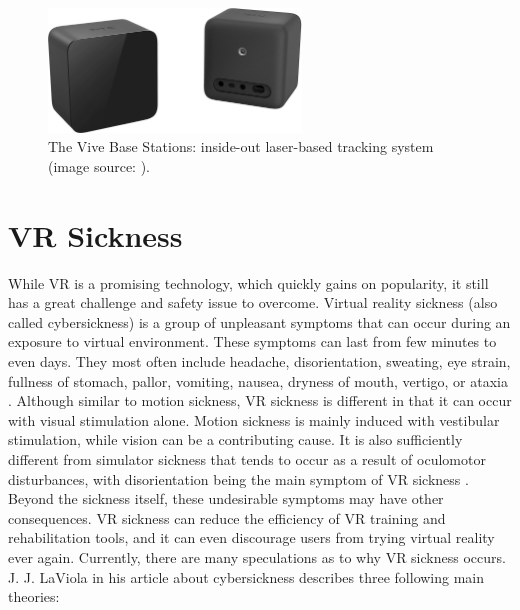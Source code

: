 \begin{figure}[th]
\centering
\includegraphics[width=0.6\textwidth]{img/base_stations.png}
\caption{The Vive Base Stations: inside-out laser-based tracking system (image source: \cite{VIVE}).}
\label{fig:BASE_STATIONS}
\end{figure}

\section{VR Sickness}

While VR is a promising technology, which quickly gains on popularity, it still has a great challenge and safety issue to overcome. Virtual reality sickness (also called cybersickness) is a group of unpleasant symptoms that can occur during an exposure to virtual environment. These symptoms can last from few minutes to even days. They most often include headache, disorientation, sweating, eye strain, fullness of stomach, pallor, vomiting, nausea, dryness of mouth, vertigo, or ataxia \cite{VRSYMPTOMSTIME}. Although similar to motion sickness, VR sickness is different in that it can occur with visual stimulation alone. Motion sickness is mainly induced with vestibular stimulation, while vision can be a contributing cause. It is also sufficiently different from simulator sickness that tends to occur as a result of oculomotor disturbances, with disorientation being the main symptom of VR sickness \cite{VRANDSIMULATORSICKNESS}. Beyond the sickness itself, these undesirable symptoms may have other consequences. VR sickness can reduce the efficiency of VR training and rehabilitation tools, and it can even discourage users from trying virtual reality ever again. Currently, there are many speculations as to why VR sickness occurs. J. J. LaViola in his article about cybersickness \cite{VRSYMPTOMS} describes three following main theories: 


